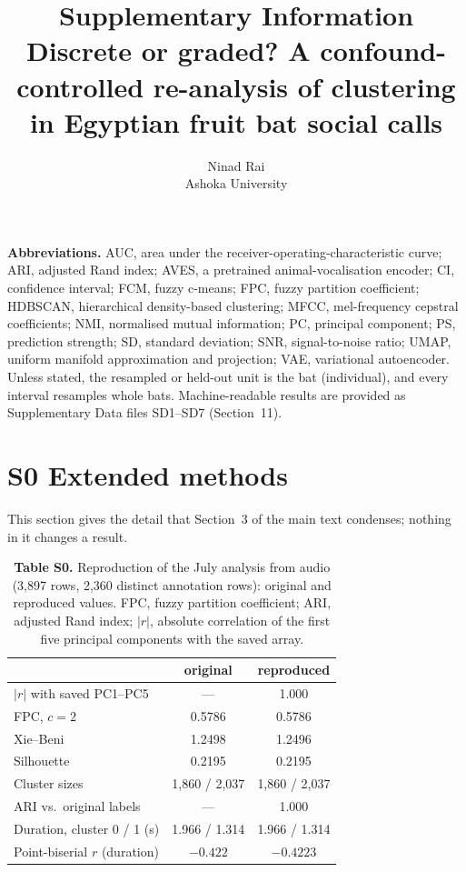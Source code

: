 \documentclass[11pt]{article}
\title{Supplementary Information\\ Discrete or graded? A confound-controlled re-analysis of clustering in Egyptian fruit bat social calls}
\author{Ninad Rai\\Ashoka University}
\date{}
\begin{document}
\maketitle
\noindent\textbf{Abbreviations.} AUC, area under the receiver-operating-characteristic curve; ARI, adjusted Rand index; AVES, a pretrained animal-vocalisation encoder; CI, confidence interval; FCM, fuzzy c-means; FPC, fuzzy partition coefficient; HDBSCAN, hierarchical density-based clustering; MFCC, mel-frequency cepstral coefficients; NMI, normalised mutual information; PC, principal component; PS, prediction strength; SD, standard deviation; SNR, signal-to-noise ratio; UMAP, uniform manifold approximation and projection; VAE, variational autoencoder. Unless stated, the resampled or held-out unit is the bat (individual), and every interval resamples whole bats. Machine-readable results are provided as Supplementary Data files SD1--SD7 (Section~11).
\tableofcontents

\section*{S0 Extended methods}
This section gives the detail that Section~3 of the main text condenses; nothing in it changes a result.

\begin{table}[htbp]\centering\small
\caption{\textbf{Table S0.} Reproduction of the July analysis from audio (3,897 rows, 2,360 distinct annotation rows): original and reproduced values. FPC, fuzzy partition coefficient; ARI, adjusted Rand index; $|r|$, absolute correlation of the first five principal components with the saved array.}
\begin{tabular}{lcc}
\toprule
 & original & reproduced \\
\midrule
$|r|$ with saved PC1--PC5 & --- & 1.000 \\
FPC, $c=2$ & 0.5786 & 0.5786 \\
Xie--Beni & 1.2498 & 1.2496 \\
Silhouette & 0.2195 & 0.2195 \\
Cluster sizes & 1,860 / 2,037 & 1,860 / 2,037 \\
ARI vs.\ original labels & --- & 1.000 \\
Duration, cluster 0 / 1 (s) & 1.966 / 1.314 & 1.966 / 1.314 \\
Point-biserial $r$ (duration) & $-0.422$ & $-0.4223$ \\
\bottomrule
\end{tabular}
\end{table}
\end{document}

